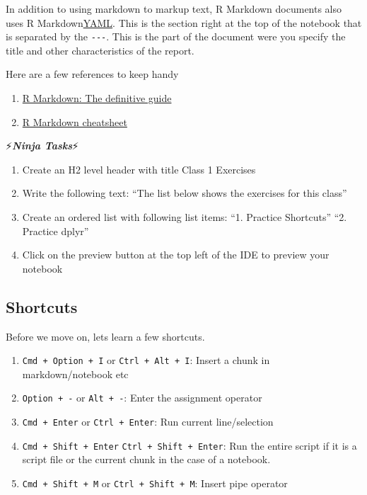 \documentclass[]{article}
\providecommand{\tightlist}{%
  \setlength{\itemsep}{0pt}\setlength{\parskip}{0pt}}
\begin{document}
In addition to using markdown to markup text, R Markdown documents also
uses {R Markdown}\href{https://en.wikipedia.org/wiki/YAML}{YAML}. This
is the section right at the top of the notebook that is separated by the
\texttt{-\/-\/-}. This is the part of the document were you specify the
title and other characteristics of the report.

Here are a few references to keep handy

\begin{enumerate}
\def\labelenumi{\arabic{enumi}.}
\tightlist
\item
  \href{https://bookdown.org/yihui/rmarkdown/}{R Markdown: The
  definitive guide}
\item
  \href{https://www.rstudio.com/wp-content/uploads/2016/03/rmarkdown-cheatsheet-2.0.pdf}{R
  Markdown cheatsheet}
\end{enumerate}

⚡\textbf{\emph{Ninja Tasks}}⚡

\begin{enumerate}
\def\labelenumi{\arabic{enumi}.}
\tightlist
\item
  Create an H2 level header with title Class 1 Exercises
\item
  Write the following text: ``The list below shows the exercises for
  this class''
\item
  Create an ordered list with following list items: ``1. Practice
  Shortcuts'' ``2. Practice dplyr''
\item
  Click on the preview button at the top left of the IDE to preview your
  notebook
\end{enumerate}

\subsection{Shortcuts}\label{shortcuts}

Before we move on, lets learn a few shortcuts.

\begin{enumerate}
\def\labelenumi{\arabic{enumi}.}
\tightlist
\item
  \texttt{Cmd\ +\ Option\ +\ I} or \texttt{Ctrl\ +\ Alt\ +\ I}: Insert a
  chunk in markdown/notebook etc
\item
  \texttt{Option\ +\ -} or \texttt{Alt\ +\ -}: Enter the assignment
  operator
\item
  \texttt{Cmd\ +\ Enter} or \texttt{Ctrl\ +\ Enter}: Run current
  line/selection
\item
  \texttt{Cmd\ +\ Shift\ +\ Enter} \texttt{Ctrl\ +\ Shift\ +\ Enter}:
  Run the entire script if it is a script file or the current chunk in
  the case of a notebook.
\item
  \texttt{Cmd\ +\ Shift\ +\ M} or \texttt{Ctrl\ +\ Shift\ +\ M}: Insert
  pipe operator
\end{enumerate}
\end{document}
